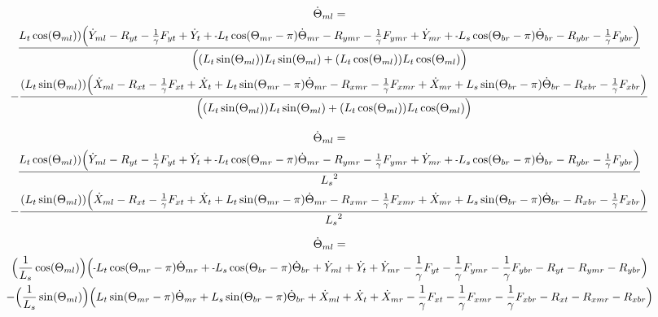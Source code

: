 \documentclass[11pt, landscape]{article}
\newcommand{\mn}{\scalebox{0.7}[1.0]{-}}
\begin{document}
\begin{multline}
\dot{\Theta}_{ml} = \\
\frac{L_{t}\cos(\Theta_{ml})) \Big( \dot{Y}_{ml} - R_{yt} - \frac{1}{\gamma}F_{yt } + \dot{Y}_{t } + \mn L_{t}\cos(\Theta_{mr}-\pi)  \dot{\Theta}_{mr}
- R_{ymr} - \frac{1}{\gamma}F_{ymr} + \dot{Y}_{mr} + \mn L_{s}\cos(\Theta_{br}-\pi)  \dot{\Theta}_{br} - R_{ybr} - \frac{1}{\gamma}F_{ybr}\Big)}
{\Big((L_{t}\sin(\Theta_{ml}))L_{t}\sin(\Theta_{ml}) + (L_{t}\cos(\Theta_{ml}))L_{t}\cos(\Theta_{ml}) \Big)} \\
- \frac{(L_{t}\sin(\Theta_{ml}))\Big( \dot{X}_{ml} - R_{xt } - \frac{1}{\gamma}F_{xt } + \dot{X}_{t } + L_{t}\sin(\Theta_{mr}-\pi)  \dot{\Theta}_{mr}
- R_{xmr} - \frac{1}{\gamma}F_{xmr} + \dot{X}_{mr} + L_{s}\sin(\Theta_{br}-\pi)  \dot{\Theta}_{br} - R_{xbr} - \frac{1}{\gamma}F_{xbr} \Big)}
{\Big((L_{t}\sin(\Theta_{ml}))L_{t}\sin(\Theta_{ml}) + (L_{t}\cos(\Theta_{ml}))L_{t}\cos(\Theta_{ml}) \Big)}
\end{multline}

\begin{multline}
\dot{\Theta}_{ml} = \\
\frac{L_{t}\cos(\Theta_{ml})) \Big( \dot{Y}_{ml} - R_{yt} - \frac{1}{\gamma}F_{yt } + \dot{Y}_{t } + \mn L_{t}\cos(\Theta_{mr}-\pi)  \dot{\Theta}_{mr}
- R_{ymr} - \frac{1}{\gamma}F_{ymr} + \dot{Y}_{mr} + \mn L_{s}\cos(\Theta_{br}-\pi)  \dot{\Theta}_{br} - R_{ybr} - \frac{1}{\gamma}F_{ybr}\Big)}
{{L_s}^2} \\
- \frac{(L_{t}\sin(\Theta_{ml}))\Big( \dot{X}_{ml} - R_{xt } - \frac{1}{\gamma}F_{xt } + \dot{X}_{t } + L_{t}\sin(\Theta_{mr}-\pi)  \dot{\Theta}_{mr}
- R_{xmr} - \frac{1}{\gamma}F_{xmr} + \dot{X}_{mr} + L_{s}\sin(\Theta_{br}-\pi)  \dot{\Theta}_{br} - R_{xbr} - \frac{1}{\gamma}F_{xbr} \Big)}
{{L_s}^2}
\end{multline}

\begin{multline}
\dot{\Theta}_{ml} = \\
\Big(\frac{1}{L_s}\cos(\Theta_{ml})\Big) \Big( \mn L_{t}\cos(\Theta_{mr}-\pi)\dot{\Theta}_{mr} + \mn L_{s}\cos(\Theta_{br}-\pi)\dot{\Theta}_{br}
 + \dot{Y}_{ml} + \dot{Y}_{t } + \dot{Y}_{mr} - \frac{1}{\gamma}F_{yt } - \frac{1}{\gamma}F_{ymr} - \frac{1}{\gamma}F_{ybr} - R_{yt} - R_{ymr} - R_{ybr} \Big) \\
- \Big(\frac{1}{L_s}\sin(\Theta_{ml})\Big)\Big(L_{t}\sin(\Theta_{mr}-\pi)  \dot{\Theta}_{mr} + L_{s}\sin(\Theta_{br}-\pi)\dot{\Theta}_{br}
+ \dot{X}_{ml} + \dot{X}_{t } + \dot{X}_{mr} - \frac{1}{\gamma}F_{xt } - \frac{1}{\gamma}F_{xmr} - \frac{1}{\gamma}F_{xbr} - R_{xt } - R_{xmr} - R_{xbr} \Big)
\end{multline}
\end{document}
